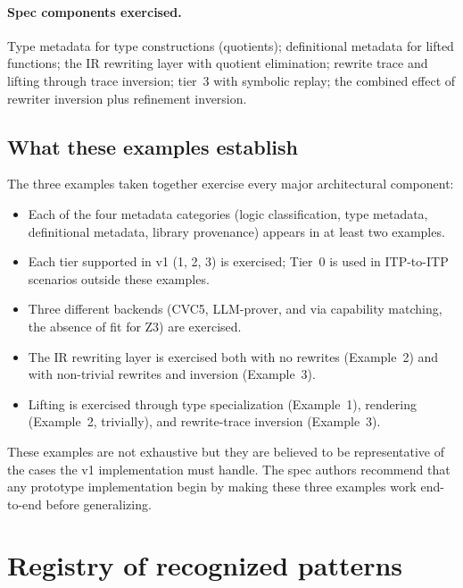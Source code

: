 \documentclass[11pt,letterpaper]{article}
\theoremstyle{definition}
\theoremstyle{remark}
\begin{document}
\paragraph{Spec components exercised.} Type metadata for type
constructions (quotients); definitional metadata for lifted functions;
the IR rewriting layer with quotient elimination; rewrite trace and
lifting through trace inversion; tier~3 with symbolic replay; the
combined effect of rewriter inversion plus refinement inversion.

\subsection{What these examples establish}

The three examples taken together exercise every major architectural
component:

\begin{itemize}[leftmargin=2em]
  \item Each of the four metadata categories (logic classification, type
        metadata, definitional metadata, library provenance) appears
        in at least two examples.
  \item Each tier supported in v1 (1, 2, 3) is exercised; Tier~0 is
        used in ITP-to-ITP scenarios outside these examples.
  \item Three different backends (CVC5, LLM-prover, and via capability
        matching, the absence of fit for Z3) are exercised.
  \item The IR rewriting layer is exercised both with no rewrites
        (Example~2) and with non-trivial rewrites and inversion
        (Example~3).
  \item Lifting is exercised through type specialization (Example~1),
        rendering (Example~2, trivially), and rewrite-trace inversion
        (Example~3).
\end{itemize}

These examples are not exhaustive but they are believed to be
representative of the cases the v1 implementation must handle. The
spec authors recommend that any prototype implementation begin by
making these three examples work end-to-end before generalizing.

\appendix

\section{Registry of recognized patterns}
\label{app:registry}
\end{document}
